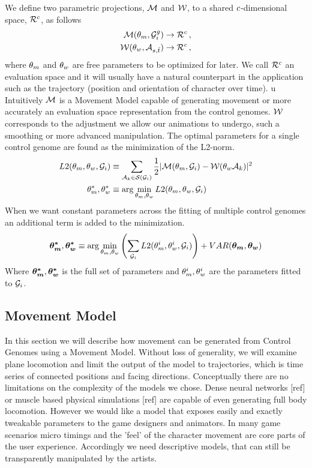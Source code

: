 We define two parametric projections, $\mathcal{M}$ and $\mathcal{W}$, to a shared $c$-dimensional space, $\mathcal{R}^{c}$, as follows
\begin{align}
\mathcal{M}(\theta_{m},\mathcal{G}_i^{g}) 
&\rightarrow 
\mathcal{R}^{c}    \,,
\\
\mathcal{W}(\theta_{w},\mathcal{A}_{s,{\hat{t}}})
&\rightarrow
\mathcal{R}^{c} \,,
\end{align}
where $\theta_{m}$ and $\theta_{w}$ are free parameters to be optimized for later. We call $\mathcal{R}^{c}$ an evaluation space and it will usually have a natural counterpart in the application such as the trajectory (position and orientation of character over time).
u
Intuitively $\mathcal{M}$ is a Movement Model capable of generating movement or more accurately an evaluation space representation from the control genomes. $\mathcal{W}$ corresponds to the adjustment we allow our animations to undergo, such a smoothing or more advanced manipulation. The optimal parameters for a single control genome are found as the minimization of the L2-norm.
\begin{subequations}
\begin{align}
    {L2}(\theta_{m},\theta_{w},\mathcal{G}_i)
    &\equiv
    \sum_{\mathcal{A}_k\in\mathcal{S}(\mathcal{G}_i)}
    {
        \frac{1}{2}
        |\mathcal{M}(\theta_{m},\mathcal{G}_i)
        -
        \mathcal{W}(\theta_{w}\mathcal{A}_k)|^2
    }
    \label{eq:optim:single}
    \\
    \theta_{m}^*,\theta_{w}^*
    &\equiv \arg\min_{\theta_{m},\theta_{w}}
    {
        {L2}(\theta_{m},\theta_{w},\mathcal{G}_i)
    }
\end{align}
\end{subequations}
When we want constant parameters across the fitting of multiple control genomes an additional term is added to the minimization. 
\begin{equation}
    \boldsymbol{\theta_{m}^* },\boldsymbol{\theta_{w}^* }
    \equiv 
    \arg\min_{\theta_{m},\theta_{w}}
    \left(
        \sum_{\mathcal{G}_i}
        {L2}(\theta_{m}^i,\theta_{w}^i,\mathcal{G}_i)
    \right)
    +
    VAR(\boldsymbol{\theta_{m} },\boldsymbol{\theta_{w} })
\end{equation}
Where $\boldsymbol{\theta_{m}^* },\boldsymbol{\theta_{w}^* }$ is the full set of parameters and $\theta_{m}^i,\theta_{w}^i$ are the parameters fitted to $\mathcal{G}_i$.

\subsection{Movement Model}
In this section we will describe how movement can be generated from Control Genomes using a Movement Model. Without loss of generality, we will examine plane locomotion and limit the output of the model to trajectories, which is time series of connected positions and facing directions. 
Conceptually there are no limitations on the complexity of the models we chose. Dense neural networks [ref] or muscle based physical simulations [ref] are capable of even generating full body locomotion. However we would like a model that exposes easily and exactly tweakable parameters to the game designers and animators. In many game scenarios micro timings and the 'feel' of the character movement are core parts of the user experience. Accordingly we need descriptive models, that can still be transparently manipulated by the artists. 

